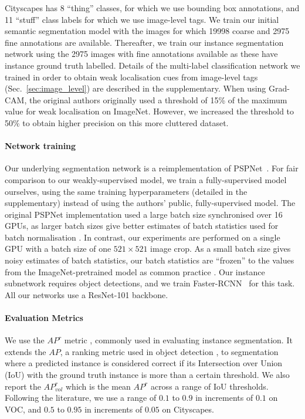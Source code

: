 \documentclass[runningheads]{llncs}
\begin{document}
Cityscapes has 8 ``thing'' classes, for which we use bounding box annotations, and 11 ``stuff'' class labels for which we use image-level tags.
We train our initial semantic segmentation model with the images for which 19998 coarse and 2975 fine annotations are available.
Thereafter, we train our instance segmentation network using the 2975 images with fine annotations available as these have instance ground truth labelled.
Details of the multi-label classification network we trained in order to obtain weak localisation cues from image-level tags (Sec.~\ref{sec:image_level}) are described in the supplementary.
When using Grad-CAM, the original authors originally used a threshold of 15\% of the maximum value for weak localisation on ImageNet.
However, we increased the threshold to 50\% to obtain higher precision on this more cluttered dataset.

\paragraph{Network training}
Our underlying segmentation network is a reimplementation of PSPNet~\cite{zhao_cvpr_2017}.
For fair comparison to our weakly-supervised model, we train a fully-supervised model ourselves, using the same training hyperparameters (detailed in the supplementary) instead of using the authors' public, fully-supervised model.
The original PSPNet implementation \cite{zhao_cvpr_2017} used a large batch size synchronised over 16 GPUs, as larger batch sizes give better estimates of batch statistics used for batch normalisation \cite{zhao_cvpr_2017,chen_arxiv_2017}.
In contrast, our experiments are performed on a single GPU with a batch size of one $521 \times 521$ image crop.
As a small batch size gives noisy estimates of batch statistics, our batch statistics are ``frozen'' to the values from the ImageNet-pretrained model as common practice \cite{chen_arxiv_2016,huang_cvpr_2017}.
Our instance subnetwork requires object detections, and we train Faster-RCNN~\cite{ren_2015} for this task.
All our networks use a ResNet-101 \cite{he_cvpr_2016} backbone.

\paragraph{Evaluation Metrics}
We use the $AP^{r}$ metric \cite{hariharan_2014}, commonly used in evaluating instance segmentation.
It extends the $AP$, a ranking metric used in object detection \cite{everingham_2010}, to segmentation where a predicted instance is considered correct if its Intersection over Union (IoU) with the ground truth instance is more than a certain threshold.
We also report the $AP^r_{vol}$ which is the mean $AP^r$ across a range of IoU thresholds.
Following the literature, we use a range of $0.1$ to $0.9$ in increments of $0.1$ on VOC, and $0.5$ to $0.95$ in increments of $0.05$ on Cityscapes.
\end{document}
